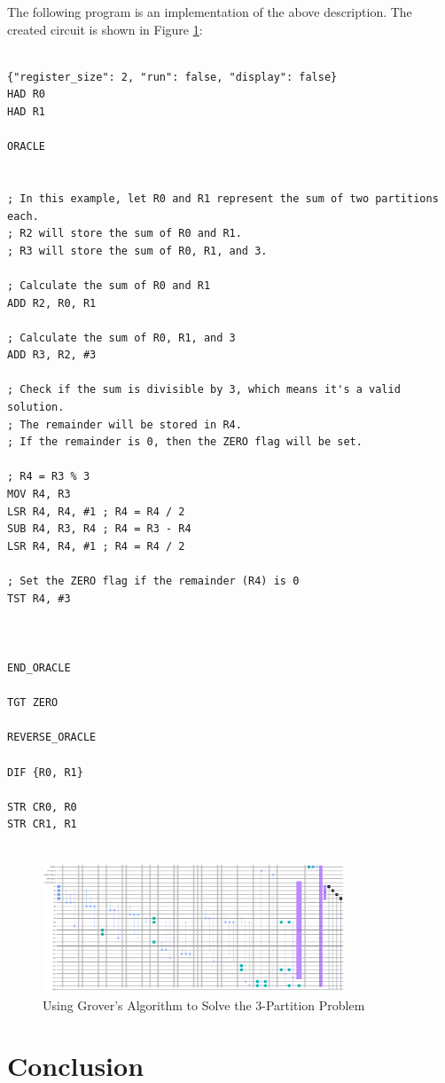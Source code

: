The following program is an implementation of the above description. The created circuit is shown in Figure \ref{fig:3-Partition}:

\begin{lstlisting}

{"register_size": 2, "run": false, "display": false}
HAD R0
HAD R1

ORACLE


; In this example, let R0 and R1 represent the sum of two partitions each.
; R2 will store the sum of R0 and R1.
; R3 will store the sum of R0, R1, and 3.

; Calculate the sum of R0 and R1
ADD R2, R0, R1

; Calculate the sum of R0, R1, and 3
ADD R3, R2, #3

; Check if the sum is divisible by 3, which means it's a valid solution.
; The remainder will be stored in R4.
; If the remainder is 0, then the ZERO flag will be set.

; R4 = R3 % 3
MOV R4, R3
LSR R4, R4, #1 ; R4 = R4 / 2
SUB R4, R3, R4 ; R4 = R3 - R4
LSR R4, R4, #1 ; R4 = R4 / 2

; Set the ZERO flag if the remainder (R4) is 0
TST R4, #3



END_ORACLE

TGT ZERO

REVERSE_ORACLE

DIF {R0, R1}

STR CR0, R0
STR CR1, R1


\end{lstlisting}

\begin{figure}[htp]
    \centering
    \includegraphics[width=9cm]{Figures/3-Partition_circuit.png}
    \caption{Using Grover's Algorithm to Solve the 3-Partition Problem}
    \label{fig:3-Partition}
\end{figure}

\section{Conclusion}

